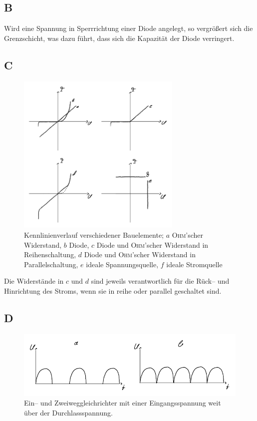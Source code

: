 \documentclass[a4paper,10pt]{article}
\numberwithin{equation}{section}
\begin{document}
\subsection{B}
Wird eine Spannung in Sperrrichtung einer Diode angelegt, so vergrößert sich die Grenzschicht, was dazu führt, dass sich die Kapazität der Diode verringert.

\subsection{C}
\begin{figure}[h]
        \centering
        \includegraphics[width=0.7\textwidth]{C_crop.pdf}
        \caption[Kennlinienverlauf verschiedener Bauelemente]{Kennlinienverlauf verschiedener Bauelemente; $a$ \textsc{Ohm}'scher Widerstand, $b$ Diode, $c$ Diode und \textsc{Ohm}'scher Widerstand in Reihenschaltung, $d$ Diode und \textsc{Ohm}'scher Widerstand in Parallelschaltung, $e$ ideale Spannungsquelle, $f$ ideale Stromquelle}
\end{figure}
\noindent Die Widerstände in $c$ und $d$ sind jeweils verantwortlich für die Rück-- und Hinrichtung des Stroms, wenn sie in reihe oder parallel geschaltet sind.

\newpage
\subsection{D}
\begin{figure}[h]
        \centering
        \includegraphics[width=\textwidth]{D_crop.pdf}
        \caption[Ein-- und Zweiweggleichrichter]{Ein-- und Zweiweggleichrichter mit einer Eingangsspannung weit über der Durchlassspannung.}
\end{figure}
\end{document}
